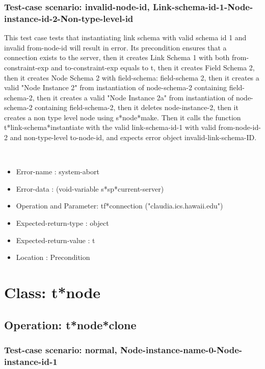 \subsubsection {Test-case scenario: invalid-node-id, Link-schema-id-1-Node-instance-id-2-Non-type-level-id}


This test case tests that instantiating link schema with valid schema id 1 and invalid from-node-id will result in error.
Its precondition ensures that a connection exists to the server, then it creates Link Schema 1 with both from-constraint-exp and to-constraint-exp equals to t, then it creates Field Schema 2, then it creates Node Schema 2 with field-schema: field-schema 2, then it creates a valid "Node Instance 2" from instantiation of node-schema-2 containing field-schema-2, then it creates a valid "Node Instance 2a" from instantiation of node-schema-2 containing field-schema-2, then it deletes node-instance-2, then it creates a non type level node using s*node*make.
Then it calls the function t*link-schema*instantiate  with the valid link-schema-id-1 with valid from-node-id-2 and non-type-level to-node-id, and expects error object invalid-link-schema-ID.



\
\begin {itemize}
\item 	Error-name             : system-abort
\item Error-data             : (void-variable s*sp*current-server)
\item Operation and Parameter: tf*connection ("claudia.ics.hawaii.edu")
\item Expected-return-type   : object
\item Expected-return-value  : t
\item Location               : Precondition



\end {itemize}
\section {Class: t*node}
\subsection {Operation: t*node*clone}
\subsubsection {Test-case scenario: normal, Node-instance-name-0-Node-instance-id-1}


